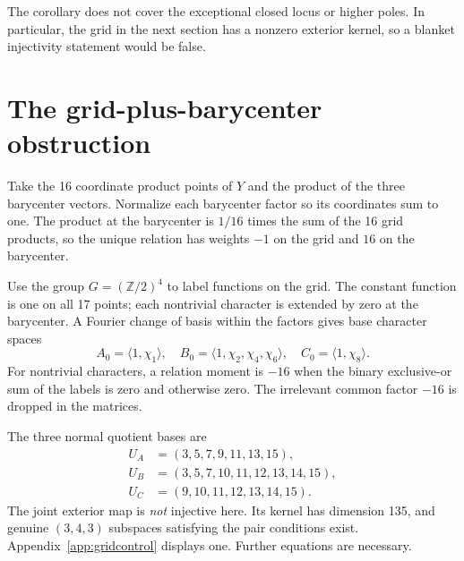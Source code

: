 \documentclass[11pt]{article}
\theoremstyle{definition}\newtheorem{definition}[theorem]{Definition}
\theoremstyle{remark}\newtheorem{remark}[theorem]{Remark}
\begin{document}
The corollary does not cover the exceptional closed locus or higher poles.
In particular, the grid in the next section has a nonzero exterior kernel,
so a blanket injectivity statement would be false.

\section{The grid-plus-barycenter obstruction}

Take the 16 coordinate product points of $Y$ and the product of the three
barycenter vectors. Normalize each barycenter factor so its coordinates
sum to one. The product at the barycenter is $1/16$ times the sum of the 16
grid products, so the unique relation has weights $-1$ on the grid and
$16$ on the barycenter.

Use the group $G=(\mathbb Z/2)^4$ to label functions on the grid. The constant
function is one on all 17 points; each nontrivial character is extended by
zero at the barycenter. A Fourier change of basis within the factors gives
base character spaces
\begin{equation}\label{eq:gridbase}
 A_0=\langle1,\chi_1\rangle,\quad
 B_0=\langle1,\chi_2,\chi_4,\chi_6\rangle,\quad
 C_0=\langle1,\chi_8\rangle.
\end{equation}
For nontrivial characters, a relation moment is $-16$ when the binary
exclusive-or sum of the labels is zero and otherwise zero. The irrelevant
common factor $-16$ is dropped in the matrices.

The three normal quotient bases are
\begin{align*}
 U_A&=(3,5,7,9,11,13,15),\\
 U_B&=(3,5,7,10,11,12,13,14,15),\\
 U_C&=(9,10,11,12,13,14,15).
\end{align*}
The joint exterior map is \emph{not} injective here. Its kernel has dimension
135, and genuine $(3,4,3)$ subspaces satisfying the pair conditions exist.
Appendix~\ref{app:gridcontrol} displays one. Further equations are necessary.
\end{document}
